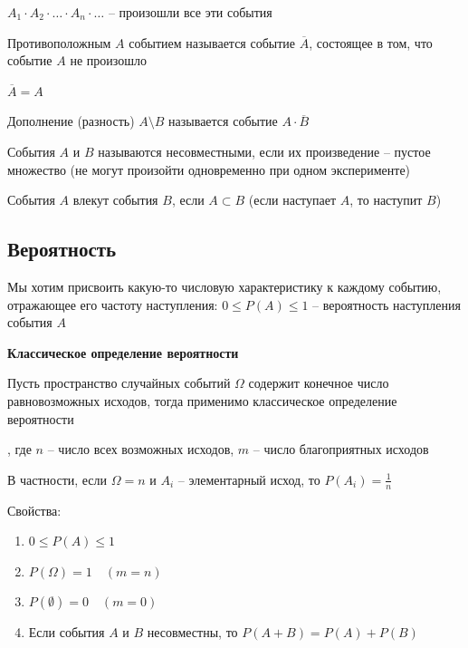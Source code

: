 \documentclass[12pt]{article}
\begin{document}
    $A_1 \cdot A_2 \cdot \dots \cdot A_n \cdot \dots$ -- произошли все эти события

     Противоположным $A$ событием называется событие $\overline{A}$, состоящее в том, что событие $A$ не произошло

    \Notas $\overline{A} = A$ %

     Дополнение (разность) $A \setminus B$ называется событие $A \cdot \overline{B}$

     События $A$ и $B$ называются несовместными, если их произведение -- пустое множество
    (не могут произойти одновременно при одном эксперименте)

     События $A$ влекут события $B$, если $A \subset B$ (если наступает $A$, то наступит $B$)

    \subsection{Вероятность}

    Мы хотим присвоить какую-то числовую характеристику к каждому событию,
    отражающее его частоту наступления: $0 \leq P(A) \leq 1$ -- вероятность наступления события $A$

    \mediumvspace

    \hypertarget{classicdefinitionofprobability}{}

    \textbf{Классическое определение вероятности}

    Пусть пространство случайных событий $\Omega$ содержит конечное число равновозможных исходов,
    тогда применимо классическое определение вероятности

    \Def {}, где $n$ -- число всех возможных исходов, $m$ -- число благоприятных исходов

    В частности, если $\Omega = n$ и $A_i$ -- элементарный исход, то $P(A_i) = \frac{1}{n}$

    Свойства:

    \begin{enumerate}
        \item $0 \leq P(A) \leq 1$

        \item $P(\Omega) = 1 \quad (m = n)$

        \item $P(\emptyset) = 0 \quad (m = 0)$

        \item Если события $A$ и $B$ несовместны, то $P(A + B) = P(A) + P(B)$
    \end{enumerate}
\end{document}

